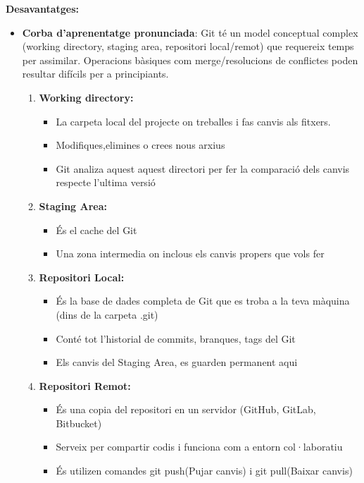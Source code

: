 \textbf{Desavantatges:}
\begin{itemize}



\item \textbf{Corba d'aprenentatge pronunciada}: Git té un model conceptual complex (working directory, staging area, repositori local/remot) que requereix temps per assimilar. Operacions bàsiques com merge/resolucions de conflictes poden resultar difícils per a principiants.

      \begin{enumerate}
        \item \textbf{Working directory:}
         \begin{itemize}
            \item La carpeta local del projecte on treballes i fas canvis als fitxers.
            \item Modifiques,elimines o crees nous arxius
            \item Git analiza aquest aquest directori per fer la comparació dels canvis respecte l'ultima versió
          \end{itemize}

        \item \textbf{Staging Area:}
         \begin{itemize}
            \item És el cache del Git
            \item Una zona intermedia on inclous els canvis propers que vols fer
          \end{itemize}

        \item \textbf{Repositori Local:}
        \begin{itemize}
            \item És la base de dades completa de Git que es troba a la teva màquina (dins de la carpeta .git)
            \item Conté tot l'historial de commits, branques, tags del Git
            \item Els canvis del Staging Area, es guarden permanent aqui
          \end{itemize}
        \item \textbf{Repositori Remot:}
        \begin{itemize}
            \item És una copia del repositori en un servidor (GitHub, GitLab, Bitbucket)
            \item Serveix per compartir codis i funciona com a entorn col·laboratiu
            \item És utilizen comandes git push(Pujar canvis) i git pull(Baixar canvis)
          \end{itemize}
       \end{enumerate}



\end{itemize}
